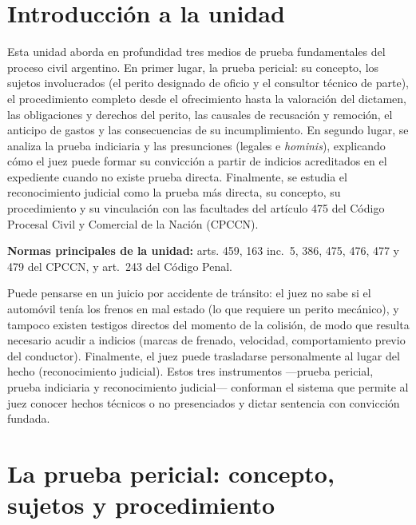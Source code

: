 \documentclass[12pt,oneside]{book}
\begin{document}
\chapter*{Introducción a la unidad}

Esta unidad aborda en profundidad tres medios de prueba fundamentales del proceso civil argentino. En primer lugar, la prueba pericial: su concepto, los sujetos involucrados (el perito designado de oficio y el consultor técnico de parte), el procedimiento completo desde el ofrecimiento hasta la valoración del dictamen, las obligaciones y derechos del perito, las causales de recusación y remoción, el anticipo de gastos y las consecuencias de su incumplimiento. En segundo lugar, se analiza la prueba indiciaria y las presunciones (legales e \textit{hominis}), explicando cómo el juez puede formar su convicción a partir de indicios acreditados en el expediente cuando no existe prueba directa. Finalmente, se estudia el reconocimiento judicial como la prueba más directa, su concepto, su procedimiento y su vinculación con las facultades del artículo 475 del Código Procesal Civil y Comercial de la Nación (CPCCN).

\textbf{Normas principales de la unidad:} arts. 459, 163 inc.\ 5, 386, 475, 476, 477 y 479 del CPCCN, y art.\ 243 del Código Penal.

\begin{note}
Puede pensarse en un juicio por accidente de tránsito: el juez no sabe si el automóvil tenía los frenos en mal estado (lo que requiere un perito mecánico), y tampoco existen testigos directos del momento de la colisión, de modo que resulta necesario acudir a indicios (marcas de frenado, velocidad, comportamiento previo del conductor). Finalmente, el juez puede trasladarse personalmente al lugar del hecho (reconocimiento judicial). Estos tres instrumentos —prueba pericial, prueba indiciaria y reconocimiento judicial— conforman el sistema que permite al juez conocer hechos técnicos o no presenciados y dictar sentencia con convicción fundada.
\end{note}

\chapter{La prueba pericial: concepto, sujetos y procedimiento}
\end{document}
